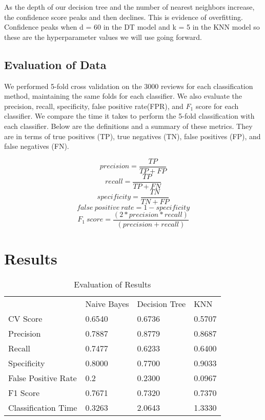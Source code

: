 \documentclass{article} %
\begin{document}
As the depth of our decision tree and the number of nearest neighbors increase, the confidence score peaks and then declines. This is evidence of overfitting. Confidence peaks when d = 60 in the DT model and k = 5 in the KNN model so these are the hyperparameter values we will use going forward.

\subsection{Evaluation of Data}
We performed 5-fold cross validation on the 3000 reviews for each classification method, maintaining the same folds for each classifier. We also evaluate the precision, recall, specificity, false positive rate(FPR),  and $F_1$ score for each classifier. We compare the time it takes to perform the 5-fold classification with each classifier. Below are the definitions and a summary of these metrics. They are in terms of true positives (TP), true negatives (TN), false positives (FP), and false negatives (FN). 

\[ precision = \frac{TP}{TP + FP} \]
\[ recall = \frac{TP}{TP + FN}\]
\[ specificity = \frac{TN}{TN + FP}\]
\[ false\ positive\ rate = 1 - specificity\]
\[ F_{1}\  score = \frac{(2*precision*recall)}{(precision + recall)}\]

\section{Results}
\begin{table}[htb!]
\centering
\caption{Evaluation of Results}
\begin{tabular}{llll}
                    & Naive Bayes & Decision Tree & KNN    \\
CV Score            & 0.6540      & 0.6736        & 0.5707 \\
Precision           & 0.7887      & 0.8779        & 0.8687 \\
Recall              & 0.7477      & 0.6233          & 0.6400 \\
Specificity         & 0.8000         & 0.7700          & 0.9033 \\
False Positive Rate & 0.2         & 0.2300          & 0.0967 \\
F1 Score            & 0.7671      & 0.7320         & 0.7370 \\
Classification Time & 0.3263      & 2.0643        & 1.3330
\end{tabular}
\end{table}
\end{document}
